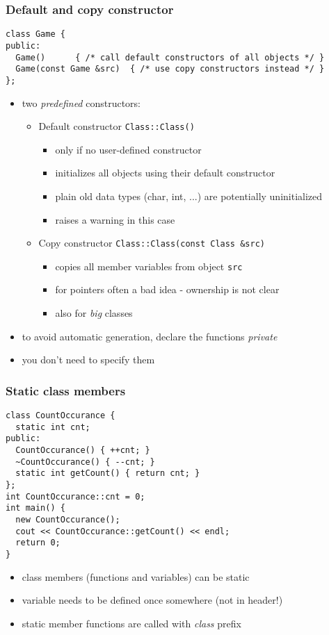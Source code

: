 \documentclass{slides}
\begin{document}
\begin{frame}[fragile]
  \frametitle{Default and copy constructor}

\begin{lstlisting}
class Game {
public:
  Game()      { /* call default constructors of all objects */ }
  Game(const Game &src)  { /* use copy constructors instead */ }
};
\end{lstlisting}

  \begin{itemize}
  \item two \emph{predefined} constructors:
    \begin{itemize}
    \item Default constructor \lstinline!Class::Class()!
      \begin{itemize}
      \item only if no user-defined constructor
      \item initializes all objects using their default constructor
      \item plain old data types (char, int, ...) are potentially
        uninitialized
      \item raises a warning in this case
      \end{itemize}
    \item Copy constructor \lstinline!Class::Class(const Class &src)!
      \begin{itemize}
      \item copies all member variables from object \lstinline!src!
      \item for pointers often a bad idea - ownership is not clear
      \item also for \emph{big} classes
      \end{itemize}
    \end{itemize}
  \item to avoid automatic generation, declare the functions
    \emph{private}
  \item you don't need to specify them
  \end{itemize}
\end{frame}

\begin{frame}[fragile]
  \frametitle{Static class members}

\begin{lstlisting}[emph={static,getCount}]
class CountOccurance {
  static int cnt;
public:
  CountOccurance() { ++cnt; }
  ~CountOccurance() { --cnt; }
  static int getCount() { return cnt; }
};
int CountOccurance::cnt = 0;
int main() {
  new CountOccurance();
  cout << CountOccurance::getCount() << endl;
  return 0;
}
\end{lstlisting}

  \begin{itemize}
  \item class members (functions and variables) can be static
  \item variable needs to be defined once somewhere (not in header!)
  \item static member functions are called with \emph{class} prefix
  \end{itemize}

\end{frame}
\end{document}
